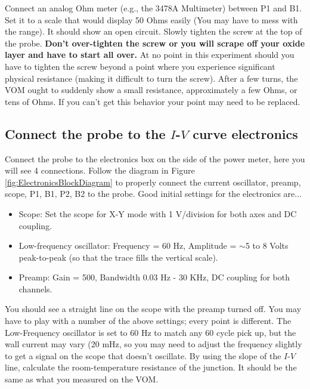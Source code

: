 \documentclass{../lab}
\begin{document}
Connect an analog Ohm meter (e.g., the 3478A Multimeter) between P1 and B1. Set it to a scale that would display 50 Ohms easily (You may have to mess with the range). It should show an open circuit. Slowly tighten the screw at the top of the probe. \textbf{Don't over-tighten the screw or you will scrape off your oxide layer and have to start all over.} At no point in this experiment should you have to tighten the screw beyond a point where you experience significant physical resistance (making it difficult to turn the screw). After a few turns, the VOM ought to suddenly show a small resistance, approximately a few Ohms, or tens of Ohms. If you can't get this behavior your point may need to be replaced.

\subsection{Connect the probe to the \texorpdfstring{$I$-$V$}{I-V} curve electronics}

Connect the probe to the electronics box on the side of the power meter, here you will see 4 connections. Follow the diagram in Figure \ref{fig:ElectronicsBlockDiagram} to properly connect the current oscillator, preamp, scope, P1, B1, P2, B2 to the probe. Good initial settings for the electronics are...

\begin{itemize}
    \item Scope: Set the scope for X-Y mode with 1 V/division for both axes and DC coupling.

    \item Low-frequency oscillator: Frequency = 60 Hz, Amplitude = $\sim$5 to 8 Volts peak-to-peak (so that the trace fills the vertical scale).

    \item Preamp: Gain = 500, Bandwidth 0.03 Hz - 30 KHz, DC coupling for both channels.
\end{itemize}

You should see a straight line on the scope with the preamp turned off. You may have to play with a number of the above settings; every point is different. The Low-Frequency oscillator is set to 60 Hz to match any 60 cycle pick up, but the wall current may vary (20 mHz, so you may need to adjust the frequency slightly to get a signal on the scope that doesn't oscillate. By using the slope of the $I$-$V$ line, calculate the room-temperature resistance of the junction. It should be the same as what you measured on the VOM.
\end{document}
